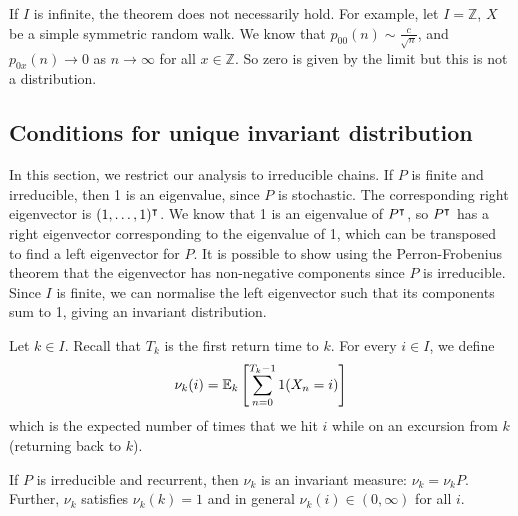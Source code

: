 \begin{remark}
	If \( I \) is infinite, the theorem does not necessarily hold.
	For example, let \( I = \mathbb Z \), \( X \) be a simple symmetric random walk.
	We know that \( p_{00}(n) \sim \frac{c}{\sqrt{n}} \), and \( p_{0x}(n) \to 0 \) as \( n \to \infty \) for all \( x \in \mathbb Z \).
	So zero is given by the limit but this is not a distribution.
\end{remark}

\subsection{Conditions for unique invariant distribution}
In this section, we restrict our analysis to irreducible chains.
If \( P \) is finite and irreducible, then 1 is an eigenvalue, since \( P \) is stochastic.
The corresponding right eigenvector is \( (1, \dots, 1)^\intercal \).
We know that 1 is an eigenvalue of \( P^\intercal \), so \( P^\intercal \) has a right eigenvector corresponding to the eigenvalue of 1, which can be transposed to find a left eigenvector for \( P \).
It is possible to show using the Perron-Frobenius theorem that the eigenvector has non-negative components since \( P \) is irreducible.
Since \( I \) is finite, we can normalise the left eigenvector such that its components sum to 1, giving an invariant distribution.
\begin{definition}
	Let \( k \in I \).
	Recall that \( T_k \) is the first return time to \( k \).
	For every \( i \in I \), we define
	\[ \nu_k(i) = \mathbb{E}_{k}\left[{\sum_{n=0}^{T_k - 1} 1(X_n = i)}\right] \]
	which is the expected number of times that we hit \( i \) while on an excursion from \( k \) (returning back to \( k \)).
\end{definition}
\begin{theorem}
	If \( P \) is irreducible and recurrent, then \( \nu_k \) is an invariant measure: \( \nu_k = \nu_k P \).
	Further, \( \nu_k \) satisfies \( \nu_k(k) = 1 \) and in general \( \nu_k(i) \in (0, \infty) \) for all \( i \).
\end{theorem}
